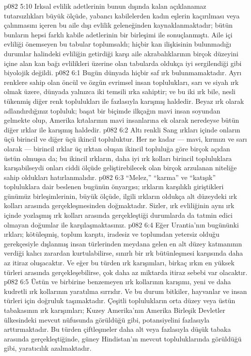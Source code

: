 \vs p082 5:10 Irksal evlilik adetlerinin bunun dışında kalan açıklanamaz tutarsızlıkları büyük ölçüde, yabancı kabilelerden kadın eşlerin kaçırılması veya çalınmasını içeren bu aile dışı evlilik geleneğinden kaynaklanmaktadır; bütün bunların hepsi farklı kabile adetlerinin bir birleşimi ile sonuçlanmıştı. Aile içi evliliği önemseyen bu tabular toplumsaldı; hiçbir kan ilişkisinin bulunmadığı durumlar halindeki evliliğin getirdiği karşı aile akrabalıklarının birçok düzeyini içine alan kan bağı evlilikleri üzerine olan tabularda oldukça iyi sergilendiği gibi biyolojik değildi.
\vs p082 6:1 Bugün dünyada hiçbir saf ırk bulunmamaktadır. Ayrı renklere sahip olan öncül ve özgün evrimsel insan toplulukları, sarı ve siyah ırk olmak üzere, dünyada yalnızca iki temsili ırka sahiptir; ve bu iki ırk bile, nesli tükenmiş diğer renk toplulukları ile fazlasıyla karışmış haldedir. Beyaz ırk olarak adlandırdığınız topluluk; başat bir biçimde ilkçağın mavi insan soyundan gelmekte olup, Amerika kıtalarının mavi insanlarına ek olarak neredeyse bütün diğer ırklar ile karışmış haldedir.
\vs p082 6:2 Altı renkli Sang ırkları içinde onların üçü birincil ve diğer üçü ikincil topluluktur. Her ne kadar --- mavi, kırmızı ve sarı olarak --- birincil ırklar üç ırktan oluşan ikincil topluluğa göre birçok açıdan üstün olmuşsa da; bu ikincil ırkların, daha iyi ırk kolları birincil topluluklara karışabilseydi onları ciddi ölçüde geliştirebilecek olan birçok arzulanan niteliğe sahip oldukları hatırlanmalıdır.
\vs p082 6:3 “Melez,” “karma” ve “katışık” topluluklara dair beslenen bugünün önyargısı; ırkların karşılıklı giriştikleri günümüz birleşimlerinin, büyük ölçüde, ilgili ırkların oldukça alt düzeydeki ırk kolları arasında gerçekleşmesinden doğmaktadır. Sizler, ırk evliliğinin aynı ırk içinde yozlaşmış ırk kolları arasında gerçekleştiği durumlarda da tatmin edici olmayan doğumlar ile karşılaşmaktasınız.
\vs p082 6:4 Eğer Urantia’nın bugününki ırkları; kötüleşmiş, toplum karşıtı, iradesiz ve toplumdan yetersiz olduğu gerekçesiyle dışlanmış insan türlerinden meydana gelen en alt düzey katmanının verdiği kalıcı zarardan kurtulabilirse, sınırlı bir ırk bütünleşmesi karşısında daha az itiraz oluşacaktır. Ve eğer bu türden ırk karışımları, birkaç ırkın en yüksek türleri arasında gerçekleşebilirse, çok daha az miktarda itiraz sebebi var olacaktır.
\vs p082 6:5 Üstün ve birbirine benzemeyen ırk kollarının karışımı, yeni ve daha kudretli ırk kollarının yaratılma sırrıdır. Ve bu durum bitkiler, hayvanlar ve insan türleri için doğruluk taşımaktadır. Çeşitli toplulukların orta düzey veya üstün tabakasının ırk karışımları; Kuzey Amerika’nın Amerika Birleşik Devletler ülkesindeki mevcut nüfusunda görüldüğü gibi,  potansiyelini fazlasıyla arttırmaktadır. Bu türden çiftleşmeler daha alt veya fazlasıyla düşük tabaka arasında gerçekleştiğinde, güney Hindistan’ın mevcut topluluklarında görüldüğü gibi, yaratıcılık azalmaktadır.
